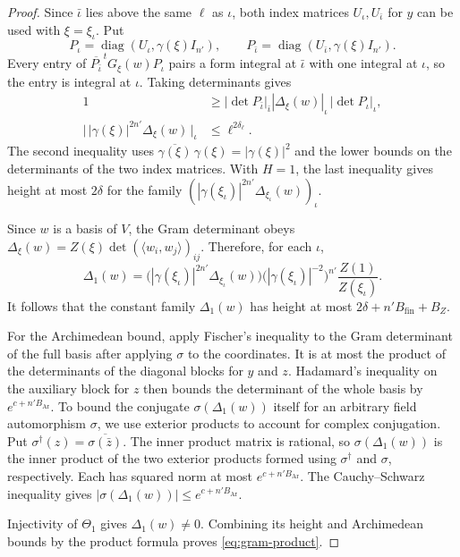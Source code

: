 \begin{proof}
Since \(\bar\iota\) lies above the same \(\ell\) as \(\iota\), both index
matrices \(U_\iota,U_{\bar\iota}\) for \(y\) can be used with
\(\xi=\xi_\iota\). Put
\[
  P_\iota=\operatorname{diag}(U_\iota,\gamma(\xi)I_{n'}),\qquad
  P_{\bar\iota}=\operatorname{diag}(U_{\bar\iota},\gamma(\xi)I_{n'}).
\]
Every entry of \(\overline{P_{\bar\iota}}^{\,t}G_\xi(w)P_\iota\) pairs a form
integral at \(\bar\iota\) with one integral at \(\iota\), so the entry is
integral at \(\iota\). Taking determinants gives
\begin{align*}
 1&\ge|\det P_{\bar\iota}|_{\bar\iota}
             |\Delta_\xi(w)|_\iota\,|\det P_\iota|_\iota,\\
 \bigl|\,|\gamma(\xi)|^{2n'}\Delta_\xi(w)\,\bigr|_\iota
     &\le\ell^{2\delta_\ell}.
\end{align*}
The second inequality uses
\(\overline{\gamma(\xi)}\,\gamma(\xi)=|\gamma(\xi)|^2\) and the lower bounds
on the determinants of the two index matrices. With \(H=1\), the last
inequality gives height at most \(2\delta\) for the family
\((|\gamma(\xi_\iota)|^{2n'}\Delta_{\xi_\iota}(w))_\iota\).

Since \(w\) is a basis of \(V\), the Gram determinant obeys
\(\Delta_\xi(w)=Z(\xi)\det(\langle w_i,w_j\rangle)_{ij}\).
Therefore, for each \(\iota\),
\[
 \Delta_1(w)
 =\bigl(|\gamma(\xi_\iota)|^{2n'}\Delta_{\xi_\iota}(w)\bigr)
     \bigl(|\gamma(\xi_\iota)|^{-2}\bigr)^{n'}
     \frac{Z(1)}{Z(\xi_\iota)} .
\]
It follows that the constant family \(\Delta_1(w)\) has height at most
\(2\delta+n'B_{\mathrm{fin}}+B_Z\).

For the Archimedean bound, apply Fischer's inequality to the Gram
determinant of the full basis after applying \(\sigma\) to the coordinates.
It is at most the product of the determinants of the diagonal blocks for
\(y\) and \(z\). Hadamard's inequality on the auxiliary block for \(z\)
then bounds the determinant of the whole basis by \(e^{c+n'B_{\mathrm{Ar}}}\).
To bound the conjugate \(\sigma(\Delta_1(w))\) itself for an arbitrary
field automorphism \(\sigma\), we use exterior products to account for
complex conjugation. Put \(\sigma^\dagger(z)=\overline{\sigma(\bar z)}\).
The inner product matrix is rational, so \(\sigma(\Delta_1(w))\) is the
inner product of the two exterior products formed using \(\sigma^\dagger\)
and \(\sigma\), respectively. Each has squared norm at most
\(e^{c+n'B_{\mathrm{Ar}}}\). The Cauchy--Schwarz inequality gives
\(\left|\sigma(\Delta_1(w))\right|\le e^{c+n'B_{\mathrm{Ar}}}\).

Injectivity of \(\Theta_1\) gives \(\Delta_1(w)\ne0\). Combining its height
and Archimedean bounds by the product formula proves \eqref{eq:gram-product}.
\end{proof}
